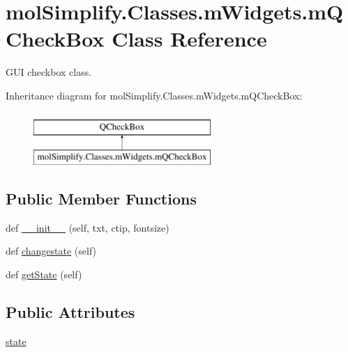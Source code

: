 \hypertarget{classmolSimplify_1_1Classes_1_1mWidgets_1_1mQCheckBox}{}\section{mol\+Simplify.\+Classes.\+m\+Widgets.\+m\+Q\+Check\+Box Class Reference}
\label{classmolSimplify_1_1Classes_1_1mWidgets_1_1mQCheckBox}


G\+UI checkbox class.  


Inheritance diagram for mol\+Simplify.\+Classes.\+m\+Widgets.\+m\+Q\+Check\+Box\+:\begin{figure}[H]
\begin{center}
\leavevmode
\includegraphics[height=2.000000cm]{classmolSimplify_1_1Classes_1_1mWidgets_1_1mQCheckBox}
\end{center}
\end{figure}
\subsection*{Public Member Functions}
\begin{DoxyCompactItemize}
\item 
def \hyperlink{classmolSimplify_1_1Classes_1_1mWidgets_1_1mQCheckBox_a487010e1018e3e7f6df83279dbf86ac9}{\+\_\+\+\_\+init\+\_\+\+\_\+} (self, txt, ctip, fontsize)
\item 
def \hyperlink{classmolSimplify_1_1Classes_1_1mWidgets_1_1mQCheckBox_ab7bae41eb0c34231e7d00df846c8da7a}{changestate} (self)
\item 
def \hyperlink{classmolSimplify_1_1Classes_1_1mWidgets_1_1mQCheckBox_a2f135c915ecfafd92d834b7e38606f93}{get\+State} (self)
\end{DoxyCompactItemize}
\subsection*{Public Attributes}
\begin{DoxyCompactItemize}
\item 
\hyperlink{classmolSimplify_1_1Classes_1_1mWidgets_1_1mQCheckBox_aceae51b12d02f3680795e1d8baa27c44}{state}
\end{DoxyCompactItemize}


